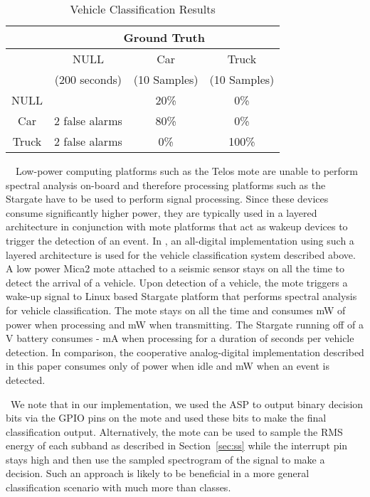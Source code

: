 \begin{table}[!t]
  \renewcommand{\arraystretch}{1.3}
  \caption{Vehicle Classification Results}
  \label{tab:classResults}
  \centering
  \begin{tabular}{|c|c|c|c|}
    \hline
    & \multicolumn{3}{|c|}{Ground Truth} \\ \hline
    & NULL & Car & Truck \\ 
    & (200 seconds) & (10 Samples) & (10 Samples) \\ \hline
    NULL &  & 20\% & 0\% \\ \hline
    Car & 2 false alarms & 80\% & 0\% \\ \hline
    Truck & 2 false alarms & 0\% & 100\% \\ \hline
  \end{tabular}
\end{table}

~~Low-power computing platforms such as the Telos mote are unable to perform spectral analysis on-board and therefore processing platforms such as the Stargate have to be used to perform signal processing. Since these devices consume significantly higher power, they are typically used in  a layered architecture in conjunction with mote platforms that act as wakeup devices to trigger the detection of an event. In \cite{lanl}, an all-digital implementation using such a layered architecture is used for the vehicle classification system described above. A low power Mica2 mote attached to a seismic sensor stays on all the time to detect the arrival of a vehicle. Upon detection of a vehicle, the mote triggers a wake-up signal to Linux based Stargate platform that performs spectral analysis for vehicle classification. The mote stays on all the time and consumes mW of power when processing and mW when transmitting. The Stargate running off of a V battery consumes - mA when processing for a duration of  seconds per vehicle detection. In comparison, the cooperative analog-digital implementation described in this paper consumes only  of power when idle and  mW when an event is detected. 

~We note that in our implementation, we used the ASP to output binary decision bits via the GPIO pins on the mote and used these bits to make the final classification output. Alternatively, the mote can be used to sample the RMS energy of each subband as described in Section~\ref{sec:ss} while the interrupt pin stays high and then use the sampled spectrogram of the signal to make a decision. Such an approach is likely to be beneficial in a more general classification scenario with much more than  classes. 

